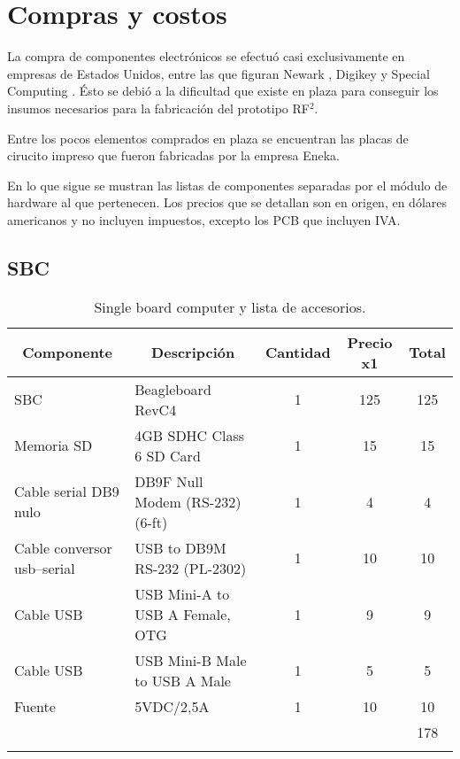\chapter{Compras y costos}

La compra de componentes electrónicos se efectuó casi exclusivamente en empresas 
de Estados Unidos, entre las que figuran Newark \cite{Nw}, Digikey \cite{Dk} y Special Computing \cite{SpeCom}. Ésto se debió a la dificultad que existe en plaza para conseguir los insumos
necesarios para la fabricación del prototipo RF$^{2}$. 

Entre los pocos elementos comprados en plaza se encuentran las placas de cirucito
impreso que fueron fabricadas por la empresa Eneka. 

En lo que sigue se mustran las listas de componentes separadas por el módulo de 
hardware al que pertenecen. Los precios que se detallan son en origen,
en dólares americanos y no incluyen impuestos, excepto los PCB que incluyen IVA.

\newpage
\section{SBC}
\begin{longtable}{|p{3cm}|l|c|c|c|}
\hline
\multicolumn{1}{|c|}{\textbf{Componente}} & \multicolumn{1}{c|}{\textbf{Descripción}} & \textbf{Cantidad} & \textbf{Precio x1} & \textbf{Total} \\ \hline
SBC & Beagleboard  RevC4 & 1 & 125 & 125 \\ \hline
Memoria SD & 4GB SDHC Class 6 SD Card & 1 & 15 & 15 \\ \hline
Cable serial DB9 nulo & DB9F Null Modem (RS-232) (6-ft) & 1 & 4 & 4 \\ \hline
Cable conversor usb–serial & USB to DB9M RS-232 (PL-2302) & 1 & 10 & 10 \\ \hline
Cable USB & USB Mini-A to USB A Female, OTG & 1 & 9 & 9 \\ \hline
Cable USB & USB Mini-B Male to USB A Male & 1 & 5 & 5 \\ \hline
Fuente  & 5VDC/2,5A & 1 & 10 & 10 \\ \hline
 &  & \multicolumn{1}{l|}{} & \multicolumn{1}{l|}{} & 178 \\ \hline
\caption{Single board computer y lista de accesorios.}
\label{}
\end{longtable}


